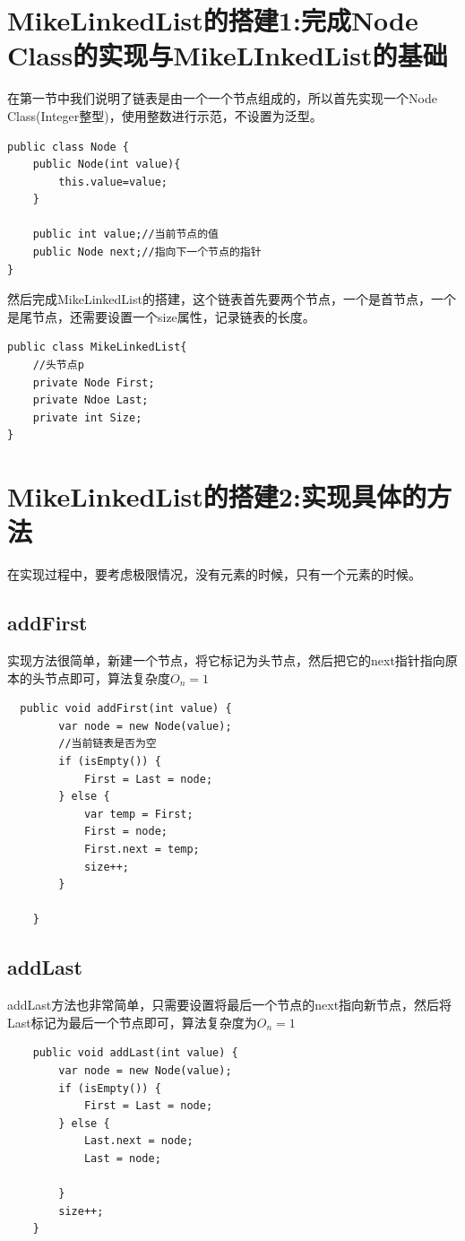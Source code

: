 \documentclass[
	11pt,
	fleqn,
	a4paper,
]{LegrandOrangeBook}
\begin{document}
\section{MikeLinkedList的搭建1:完成Node Class的实现与MikeLInkedList的基础}
在第一节中我们说明了链表是由一个一个节点组成的，所以首先实现一个Node Class(Integer整型)，使用整数进行示范，不设置为泛型。
\begin{verbatim}
public class Node {
    public Node(int value){
        this.value=value;
    }

    public int value;//当前节点的值
    public Node next;//指向下一个节点的指针
}
\end{verbatim}
然后完成MikeLinkedList的搭建，这个链表首先要两个节点，一个是首节点，一个是尾节点，还需要设置一个size属性，记录链表的长度。
\begin{verbatim}
public class MikeLinkedList{
	//头节点p
	private Node First;
	private Ndoe Last;
	private int Size;
}
\end{verbatim}

\section{MikeLinkedList的搭建2:实现具体的方法}
在实现过程中，要考虑极限情况，没有元素的时候，只有一个元素的时候。
\subsection{addFirst}
实现方法很简单，新建一个节点，将它标记为头节点，然后把它的next指针指向原本的头节点即可，算法复杂度$O_n=1$
\begin{verbatim}
  public void addFirst(int value) {
        var node = new Node(value);
        //当前链表是否为空
        if (isEmpty()) {
            First = Last = node;
        } else {
            var temp = First;
            First = node;
            First.next = temp;
            size++;
        }

    }
\end{verbatim}
\subsection{addLast}
addLast方法也非常简单，只需要设置将最后一个节点的next指向新节点，然后将Last标记为最后一个节点即可，算法复杂度为$O_n=1$
\begin{verbatim}
	public void addLast(int value) {
        var node = new Node(value);
        if (isEmpty()) {
            First = Last = node;
        } else {
            Last.next = node;
            Last = node;

        }
        size++;
    }
\end{verbatim}
\end{document}
